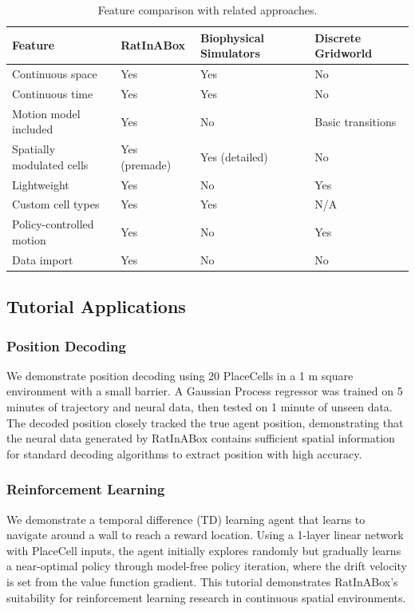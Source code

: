 \documentclass[12pt]{article}
\begin{document}
\begin{table}[htbp]
\centering
\caption{Feature comparison with related approaches.}
\label{tab:comparison}
\begin{tabular}{llll}
\toprule
Feature & RatInABox & Biophysical Simulators & Discrete Gridworld \\
\midrule
Continuous space & Yes & Yes & No \\
Continuous time & Yes & Yes & No \\
Motion model included & Yes & No & Basic transitions \\
Spatially modulated cells & Yes (premade) & Yes (detailed) & No \\
Lightweight & Yes & No & Yes \\
Custom cell types & Yes & Yes & N/A \\
Policy-controlled motion & Yes & No & Yes \\
Data import & Yes & No & No \\
\bottomrule
\end{tabular}
\end{table}

\subsection{Tutorial Applications}

\subsubsection{Position Decoding}

We demonstrate position decoding using 20 PlaceCells in a 1 m square environment with a small barrier. A Gaussian Process regressor was trained on 5 minutes of trajectory and neural data, then tested on 1 minute of unseen data. The decoded position closely tracked the true agent position, demonstrating that the neural data generated by RatInABox contains sufficient spatial information for standard decoding algorithms to extract position with high accuracy.

\subsubsection{Reinforcement Learning}

We demonstrate a temporal difference (TD) learning agent that learns to navigate around a wall to reach a reward location. Using a 1-layer linear network with PlaceCell inputs, the agent initially explores randomly but gradually learns a near-optimal policy through model-free policy iteration, where the drift velocity is set from the value function gradient. This tutorial demonstrates RatInABox's suitability for reinforcement learning research in continuous spatial environments.
\end{document}
